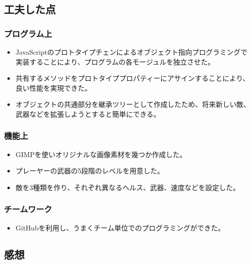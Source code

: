 \subsection{工夫した点}
	\subsubsection{プログラム上}
		\begin{itemize}
			\item JavaScriptのプロトタイプチェンによるオブジェクト指向プログラミングで実装することにより、プログラムの各モージュルを独立させた。
			\item 共有するメソッドをプロトタイププロパティーにアサインすることにより、良い性能を実現できた。
			\item オブジェクトの共通部分を継承ツリーとして作成したため、将来新しい敵、武器などを拡張しようとすると簡単にできる。
		\end{itemize}
	\subsubsection{機能上}
		\begin{itemize}
			\item GIMPを使いオリジナルな画像素材を幾つか作成した。
			\item プレーヤーの武器の5段階のレベルを用意した。
			\item 敵を3種類を作り、それぞれ異なるヘルス、武器、速度などを設定した。
		\end{itemize}
	\subsubsection{チームワーク}
		\begin{itemize}
			\item GitHubを利用し、うまくチーム単位でのプログラミングができた。
		\end{itemize}
\subsection{感想}
		